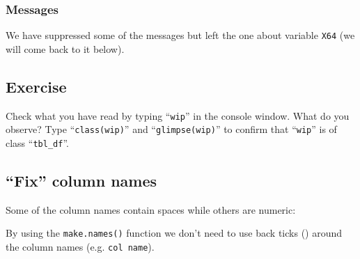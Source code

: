 \documentclass[a4paper,9pt,twocolumn,twoside,printwatermark=false]{pinp}
\begin{document}
\subsubsection{Messages}\label{messages}

We have suppressed some of the messages but left the one about variable
\texttt{X64} (we will come back to it below).

\subsection{Exercise}\label{exercise-1}

Check what you have read by typing ``\texttt{wip}'' in the console
window. What do you observe? Type ``\texttt{class(wip)}'' and
``\texttt{glimpse(wip)}'' to confirm that ``\texttt{wip}'' is of class
``\texttt{tbl\_df}''.

\subsection{\texorpdfstring{``Fix'' column
names}{Fix column names}}\label{fix-column-names}

Some of the column names contain spaces while others are numeric:

\begin{Shaded}
\begin{Highlighting}[]
\NormalTok{(}
\NormalTok{(}
\end{Highlighting}
\end{Shaded}

By using the \texttt{make.names()} function we don't need to use back
ticks (\texttt{\textasciigrave{}}) around the column names (e.g.
\texttt{\textasciigrave{}col\ name\textasciigrave{}}).

\begin{Shaded}
\begin{Highlighting}[]
\StringTok{ }\NormalTok{(}
\NormalTok{(}
\NormalTok{(}
\end{Highlighting}
\end{Shaded}
\end{document}

